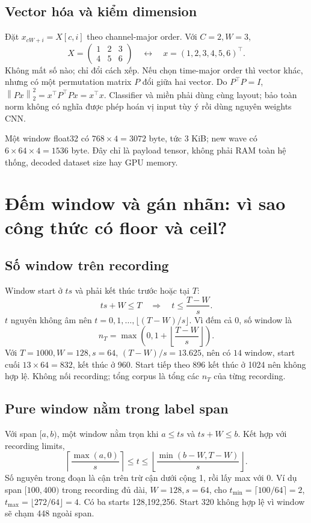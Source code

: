 \documentclass[11pt,a4paper]{article}
\newcommand{\norm}[1]{\left\lVert#1\right\rVert}
\theoremstyle{definition}
\begin{document}
\subsection{Vector hóa và kiểm dimension}
Đặt $x_{cW+i}=X[c,i]$ theo channel-major order. Với $C=2,W=3$,
\begin{equation}
X=\begin{pmatrix}1&2&3\\4&5&6\end{pmatrix}
\quad\longleftrightarrow\quad x=(1,2,3,4,5,6)^\top.
\end{equation}
Không mất số nào; chỉ đổi cách xếp. Nếu chọn time-major order thì vector
khác, nhưng có một permutation matrix $P$ đổi giữa hai vector. Do
$P^\top P=I$, $\norm{Px}_2^2=x^\top P^\top Px=x^\top x$.
Classifier và miền phải dùng cùng layout; bảo toàn norm không có nghĩa
được phép hoán vị input tùy ý rồi dùng nguyên weights CNN.

Một window float32 có $768\times4=3072$ byte, tức 3 KiB; new wave có
$6\times64\times4=1536$ byte. Đây chỉ là payload tensor, không phải RAM
toàn hệ thống, decoded dataset size hay GPU memory.

\section{Đếm window và gán nhãn: vì sao công thức có floor và ceil?}
\subsection{Số window trên recording}
Window start ở $ts$ và phải kết thúc trước hoặc tại $T$:
\begin{equation}
ts+W\le T\quad\Rightarrow\quad t\le\frac{T-W}{s}.
\end{equation}
$t$ nguyên không âm nên $t=0,1,\ldots,\lfloor(T-W)/s\rfloor$.
Vì đếm cả 0, số window là
\begin{equation}
n_T=\max\left(0,1+\left\lfloor\frac{T-W}{s}\right\rfloor\right).
\end{equation}
Với $T=1000,W=128,s=64$, $(T-W)/s=13.625$, nên có $14$ window,
start cuối $13\times64=832$, kết thúc ở 960. Start tiếp theo 896 kết thúc
ở 1024 nên không hợp lệ. Không nối recording; tổng corpus là tổng các
$n_T$ của từng recording.

\subsection{Pure window nằm trong label span}
Với span $[a,b)$, một window nằm trọn khi
$a\le ts$ và $ts+W\le b$. Kết hợp với recording limits,
\begin{equation}
\left\lceil\frac{\max(a,0)}s\right\rceil
\le t\le
\left\lfloor\frac{\min(b-W,T-W)}s\right\rfloor.
\end{equation}
Số nguyên trong đoạn là cận trên trừ cận dưới cộng 1, rồi lấy max với 0.
Ví dụ span $[100,400)$ trong recording đủ dài, $W=128,s=64$, cho
$t_{\min}=\lceil100/64\rceil=2$,
$t_{\max}=\lfloor272/64\rfloor=4$. Có ba starts 128,192,256. Start 320
không hợp lệ vì window sẽ chạm 448 ngoài span.
\end{document}
